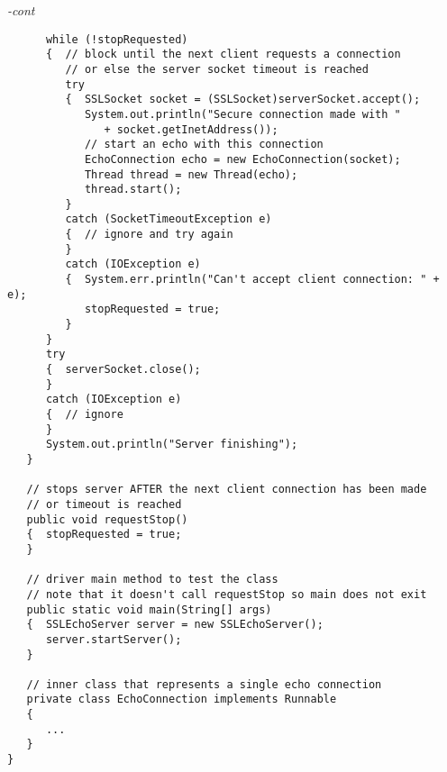 \begin{figure*}\begin{program}\emph{-cont}\begin{verbatim}
      while (!stopRequested)
      {  // block until the next client requests a connection
         // or else the server socket timeout is reached
         try
         {  SSLSocket socket = (SSLSocket)serverSocket.accept();
            System.out.println("Secure connection made with "
               + socket.getInetAddress());
            // start an echo with this connection
            EchoConnection echo = new EchoConnection(socket);
            Thread thread = new Thread(echo);
            thread.start();
         }
         catch (SocketTimeoutException e)
         {  // ignore and try again
         }
         catch (IOException e)
         {  System.err.println("Can't accept client connection: " + e);
            stopRequested = true;
         }
      }
      try
      {  serverSocket.close();
      }
      catch (IOException e)
      {  // ignore
      }
      System.out.println("Server finishing");
   }

   // stops server AFTER the next client connection has been made
   // or timeout is reached
   public void requestStop()
   {  stopRequested = true;
   }

   // driver main method to test the class
   // note that it doesn't call requestStop so main does not exit
   public static void main(String[] args)
   {  SSLEchoServer server = new SSLEchoServer();
      server.startServer();
   }

   // inner class that represents a single echo connection
   private class EchoConnection implements Runnable
   {
      ...
   }
}
\end{verbatim}\end{program}\end{figure*}

